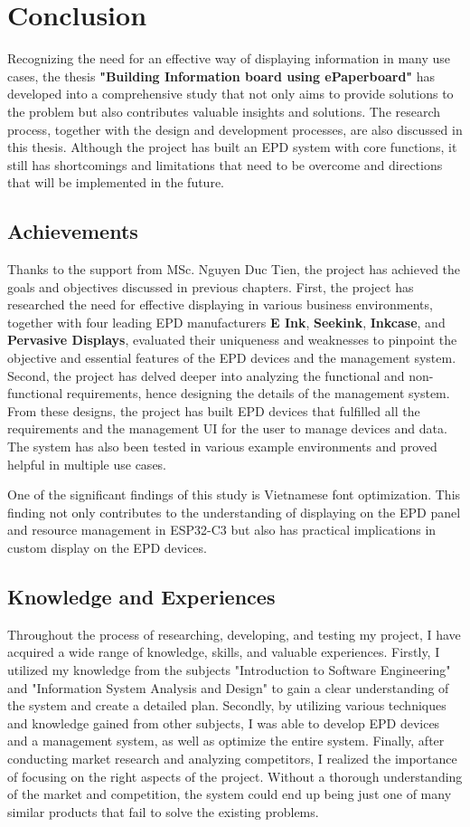 \documentclass[../Main.tex]{subfiles}
\begin{document}
\section{Conclusion}
Recognizing the need for an effective way of displaying information in many use cases, the thesis \textbf{"Building Information board using ePaperboard"} has developed into a comprehensive study that not only aims to provide solutions to the problem but also contributes valuable insights and solutions. The research process, together with the design and development processes, are also discussed in this thesis. Although the project has built an EPD system with core functions, it still has shortcomings and limitations that need to be overcome and directions that will be implemented in the future.

\subsection{Achievements}
Thanks to the support from MSc. Nguyen Duc Tien, the project has achieved the goals and objectives discussed in previous chapters. First, the project has researched the need for effective displaying in various business environments, together with four leading EPD manufacturers \textbf{E Ink}, \textbf{Seekink}, \textbf{Inkcase}, and \textbf{Pervasive Displays}, evaluated their uniqueness and weaknesses to pinpoint the objective and essential features of the EPD devices and the management system. Second, the project has delved deeper into analyzing the functional and non-functional requirements, hence designing the details of the management system. From these designs, the project has built EPD devices that fulfilled all the requirements and the management UI for the user to manage devices and data. The system has also been tested in various example environments and proved helpful in multiple use cases.

One of the significant findings of this study is Vietnamese font optimization. This finding not only contributes to the understanding of displaying on the EPD panel and resource management in ESP32-C3 but also has practical implications in custom display on the EPD devices.

\subsection{Knowledge and Experiences}
Throughout the process of researching, developing, and testing my project, I have acquired a wide range of knowledge, skills, and valuable experiences. Firstly, I utilized my knowledge from the subjects "Introduction to Software Engineering" and "Information System Analysis and Design" to gain a clear understanding of the system and create a detailed plan. Secondly, by utilizing various techniques and knowledge gained from other subjects, I was able to develop EPD devices and a management system, as well as optimize the entire system. Finally, after conducting market research and analyzing competitors, I realized the importance of focusing on the right aspects of the project. Without a thorough understanding of the market and competition, the system could end up being just one of many similar products that fail to solve the existing problems.
\end{document}
